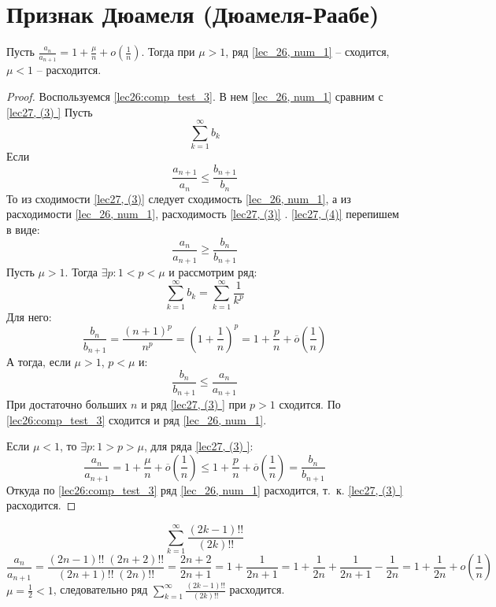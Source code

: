 \documentclass[../../main.tex]{subfiles}
\begin{document}
	\section{Признак Дюамеля (Дюамеля-Раабе)}
	
	\begin{thm}\label{lec27,duamele_raabe}
		Пусть $\frac{a_n}{a_{n+1}} = 1 + \frac{\mu}{n} + o\left( \frac{1}{n}\right) 
		$. Тогда при $\mu > 1$, ряд \ref{lec_26, num_1} \--- сходится, $\mu < 1$ 
		\--- расходится.
		\begin{proof}
			Воспользуемся \ref{lec26:comp_test_3}. В нем \ref{lec_26, num_1} сравним с 
			\ref{lec27, (3) }
			Пусть \begin{equation} \label{lec27, (3) }
			\sum_{k = 1}^{\infty} b_k
			\end{equation}
			Если \begin{equation}\label{lec27, (4) }
			\frac{a_{n+1}}{a_n} \le \frac{b_{n+1}}{b_n}
			\end{equation}
			То из сходимости \ref{lec27, (3)} следует сходимость \ref{lec_26, num_1}, а 
			из расходимости  \ref{lec_26, num_1}, расходимость \ref{lec27, (3)} . 
			\ref{lec27, (4)} перепишем в виде:
			\begin{equation} \label{lec27,(5)}
			\frac{a_n}{a_{n+1}} \ge \frac{b_n}{b_{n+1}}
			\end{equation}
			Пусть $\mu > 1$. Тогда $\exists p :  1 < p < \mu$ и рассмотрим ряд:
			\[  \sum_{k=1}^{\infty} b_k = \sum_{k=1}^{\infty} \frac{1}{k^p}    \]
			Для него:
			\[ \frac{b_n}{b_{n+1}} = \frac{(n+1)^p}{n^p} = \left( 1 + \frac{1}{n} 
			\right)^p = 1 + \frac{p}{n} + \overline{o}\left( \frac{1}{n} \right)       
			\]
			А тогда, если $\mu > 1$, $p < \mu$ и:
			\[ \frac{b_n}{b_{n+1}} \le \frac{a_n}{a_{n+1}}      \]
			При достаточно больших $n$ и ряд \ref{lec27, (3) } при $p > 1$ сходится. По 
			\ref{lec26:comp_test_3} сходится и ряд \ref{lec_26, num_1}.
			
			Если $\mu < 1$, то $\exists p : 1 > p > \mu$, для ряда \ref{lec27, (3) }:
			\[  \frac{a_n}{a_{n+1}} = 1 + \frac{\mu}{n} + \overline{o}\left( 
			\frac{1}{n} \right) \le  1 + \frac{p}{n} + \overline{o}\left( \frac{1}{n} 
			\right) = \frac{b_n}{b_{n+1}}                   \]
			Откуда по \ref{lec26:comp_test_3} ряд \ref{lec_26, num_1} расходится, т.~к. 
			\ref{lec27, (3) } расходится.
		\end{proof}
	\end{thm}	
	
	
	\begin{example}
		\[ \sum_{k=1}^{\infty} \frac{(2k-1)!!}{(2k)!!}    \]
		\[ \frac{a_n}{a_{n+1}} = \frac{ (2n-1)!! \; (2n+2)!!}{ (2n+1)!! \;  (2n)!! } 
		= \frac{2n+2}{2n+1} = 1 + \frac{1}{2n+1} = 1 + \frac{1}{2n} + \frac{1}{2n+1} 
		- \frac{1}{2n} = 1 + \frac{1}{2n} + o\left( \frac{1}{n} \right)     \]
		$\mu = \frac{1}{2} < 1$, следовательно ряд $\sum_{k=1}^{\infty} 
		\frac{(2k-1)!!}{(2k)!!}$ расходится.
		
	\end{example}	
\end{document}
